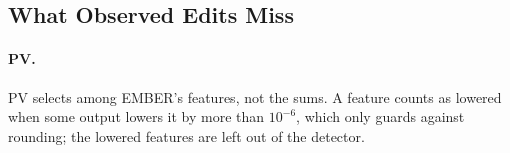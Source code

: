
\subsection{What Observed Edits Miss}
\label{sec:attacks:observed}

\paragraph{PV.} PV selects among EMBER's features, not the sums. A feature counts as lowered when some output lowers
it by more than $10^{-6}$, which only guards against rounding; the lowered features are left out of the detector.

